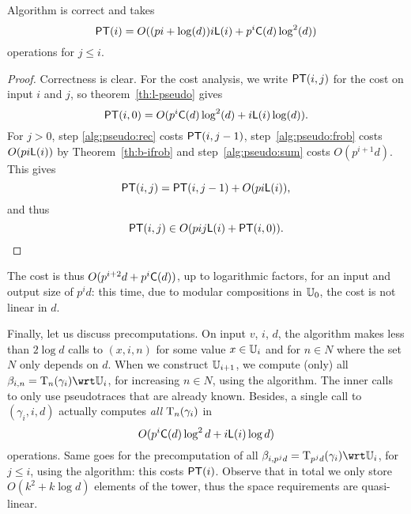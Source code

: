 \begin{theorem}
  \label{th:b-pseudo}
  Algorithm  is correct and takes 
  \begin{equation}
    \label{eq:97}
    \mathsf{PT}(i)=O((pi+\log (d))i\mathsf{L}(i)+p^i\mathsf{C}(d)\log^2 (d))    
  \end{equation}
  operations for $j \le i$.
\end{theorem}
\begin{proof}
  Correctness is clear. For the cost analysis, we write $\mathsf{PT}(i,j)$
  for the cost on input $i$ and $j$, so theorem~\ref{th:l-pseudo}
  gives 
  \begin{equation}
    \label{eq:101}
    \mathsf{PT}(i,0)=O(p^i\mathsf{C}(d)\log^2 (d) + i \mathsf{L}(i)\log(d))
    \text{.} 
  \end{equation}
  For $j>0$, step \ref{alg:pseudo:rec} costs $\mathsf{PT}(i,j-1)$,
  step~\ref{alg:pseudo:frob} costs $O(p i \mathsf{L}(i))$ by
  Theorem~\ref{th:b-ifrob} and step~\ref{alg:pseudo:sum} costs
  $O(p^{i+1}d)$. This gives 
  \begin{equation}
    \label{eq:102}
    \mathsf{PT}(i,j) = \mathsf{PT}(i,j-1) +O(p i \mathsf{L}(i))
    \text{,}
  \end{equation}
  and thus 
  \begin{equation}
    \label{eq:103}
    \mathsf{PT}(i,j) \in O(pij\mathsf{L}(i) + \mathsf{PT}(i,0))
    \text{.}
  \end{equation}
\end{proof}

The cost is thus $O(p^{i+2}d+p^i\mathsf{C}(d))$, up to logarithmic
factors, for an input and output size of $p^id$: this time, due to
modular compositions in $\mathbb{U}_0$, the cost is not linear in $d$.

Finally, let us discuss precomputations. On input $v$, $i$, $d$, the
algorithm 
makes less than $2\log d$ calls to
$(x,i,n)$ for
some value $x\in\mathbb{U}_i$ and for $n\in N$ where the set $N$ only depends
on $d$. When we construct $\mathbb{U}_{i+1}$, we compute (only) all
$\beta_{i,n}=\PTr_{n}(\gamma_i) \wrt\U_i$, for increasing $n\in N$,
using the 
algorithm. The inner calls to
 only use
pseudotraces that are already known. Besides, a single call to
$(\gamma_i,i,d)$
actually computes {\em all} $\operatorname{T}_{n}(\gamma_i)$ in 
\begin{equation}
  \label{eq:104}
  O(p^i\mathsf{C}(d)\log^2 d + i
  \mathsf{L}(i)\log d)
\end{equation}
operations. Same goes for the precomputation of all
$\beta_{i,p^jd}=\PTr_{p^jd}(\gamma_i) \wrt\U_i$, for $j\le i$, using
the  algorithm: this costs
$\mathsf{PT}(i)$. Observe that in total we only store $O(k^2 + k\log d)$
elements of the tower, thus the space requirements are quasi-linear.

